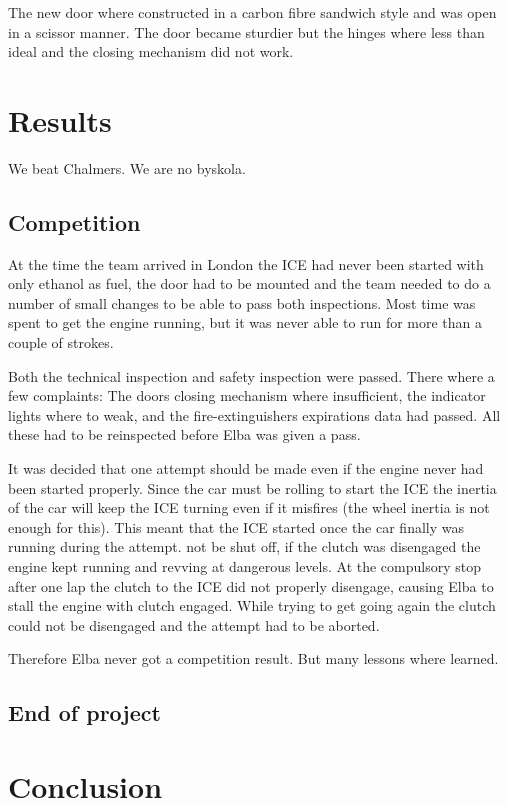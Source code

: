 The new door where constructed in a carbon fibre sandwich style and was open in
a scissor manner. The door became sturdier but the hinges where less than ideal
and the closing mechanism did not work.

\section{Results}
We beat Chalmers. We are no byskola.

\subsection{Competition}
At the time the team arrived in London the ICE had never been started with only
ethanol as fuel, the door had to be mounted and the team needed to do a number
of small changes to be able to pass both inspections. Most time was spent to get
the engine running, but it was never able to run for more than a couple of
strokes. 

Both the technical inspection and safety inspection were passed. There where a
few complaints: The doors closing mechanism where insufficient, the indicator
lights where to weak, and the fire-extinguishers expirations data had passed.
All these had to be reinspected before Elba was given a pass.

It was decided that one attempt should be made even if the engine never had been
started properly. Since the car must be rolling to start the ICE the inertia of
the car will keep the ICE turning even if it misfires (the wheel inertia is not
enough for this). This meant that the ICE started once the car finally was
running during the attempt. %
not be shut off, if the clutch was disengaged the engine kept running and
revving at dangerous levels. %
At the compulsory stop after one lap the clutch to the ICE did not properly
disengage, causing Elba to stall the engine with clutch engaged. While trying to
get going again the clutch could not be disengaged and the attempt had to be
aborted.

Therefore Elba never got a competition result. But many lessons where learned.

\subsection{End of project}

\section{Conclusion}
